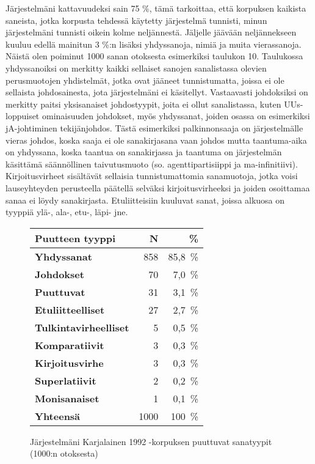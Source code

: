 \documentclass[free]{flammie}
\begin{document}
Järjestelmäni kattavuudeksi sain 75 \%, tämä tarkoittaa, että korpuksen kaikista
saneista, jotka korpusta tehdessä käytetty järjestelmä tunnisti, minun järjestelmäni tunnisti oikein kolme neljännestä. Jäljelle jäävään neljännekseen kuuluu edellä
mainitun 3 \%:n lisäksi yhdyssanoja, nimiä ja muita vierassanoja. Näistä olen poiminut 1000 sanan otoksesta esimerkiksi taulukon 10. Taulukossa yhdyssanoiksi
on merkitty kaikki sellaiset sanojen sanalistassa olevien perusmuotojen yhdistelmät, jotka ovat jääneet tunnistumatta, joissa ei ole sellaista johdosainesta, jota
järjestelmäni ei käsitellyt. Vastaavasti johdoksiksi on merkitty paitsi yksisanaiset
johdostyypit, joita ei ollut sanalistassa, kuten UUs-loppuiset ominaisuuden johdokset, myös yhdyssanat, joiden osassa on esimerkiksi jA-johtiminen tekijänjohdos. Tästä esimerkiksi palkinnonsaaja on järjestelmälle vieras johdos, koska saaja
ei ole sanakirjasana vaan johdos mutta taantuma-aika on yhdyssana, koska taantua on sanakirjassa ja taantuma on järjestelmän käsittämä säännöllinen taivutusmuoto (so. agenttipartisiippi ja ma-infinitiivi). Kirjoitusvirheet sisältävät sellaisia
tunnistumattomia sanamuotoja, jotka voisi lauseyhteyden perusteella päätellä selväksi kirjoitusvirheeksi ja joiden osoittamaa sanaa ei löydy sanakirjasta. Etuliitteisiin kuuluvat sanat, joissa alkuosa on tyyppiä ylä-, ala-, etu-, läpi- jne.

\begin{figure}
    \caption{Järjestelmäni Karjalainen 1992 -korpuksen puuttuvat sanatyypit (1000:n
    otoksesta)}
    \begin{tabular}{l|r|r}
    \hline
        \bf Puutteen tyyppi & N & \% \\
\hline
\hline
\bf Yhdyssanat & 858 & 85,8~\% \\
\hline
        \bf Johdokset & 70 & 7,0~\% \\
\hline
        \bf Puuttuvat & 31 & 3,1~\% \\
\hline
\bf Etuliitteelliset & 27 & 2,7~\% \\
\hline
\bf Tulkintavirheelliset & 5 & 0,5~\% \\
\hline
\bf Komparatiivit & 3 & 0,3~\% \\
\hline
\bf Kirjoitusvirhe & 3 & 0,3~\% \\
\hline
\bf Superlatiivit & 2 & 0,2~\% \\
\hline
\bf Monisanaiset & 1 & 0,1~\% \\
\hline
\hline
\bf Yhteensä & 1000 & 100~\% \\
\hline
    \end{tabular}
\end{figure}
\end{document}
